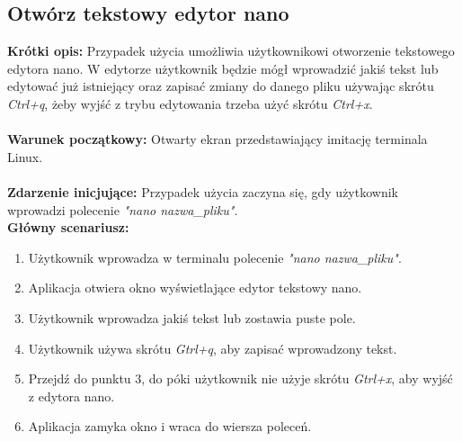\documentclass[10pt,a4paper]{report}
\begin{document}
\begin{adjustwidth}{2cm}{2cm}
\subsection{Otwórz tekstowy edytor nano}
\begin{minipage}{1\linewidth}
\textbf{Krótki opis:} Przypadek użycia umożliwia użytkownikowi otworzenie tekstowego edytora nano. W edytorze użytkownik będzie mógł wprowadzić jakiś tekst lub edytować już istniejący oraz zapisać zmiany do danego pliku używając skrótu \textit{Ctrl+q}, żeby wyjść z trybu edytowania trzeba użyć skrótu \textit{Ctrl+x}. \\ \\
\textbf{Warunek początkowy:} Otwarty ekran przedstawiający imitację terminala Linux. \\ \\
\textbf{Zdarzenie inicjujące:} Przypadek użycia zaczyna się, gdy użytkownik wprowadzi polecenie \textit{"nano nazwa\_pliku"}. \\
\textbf{Główny scenariusz:} 
\begin{enumerate}
\setlength\itemsep{0.2cm}
    \item Użytkownik wprowadza w terminalu polecenie \textit{"nano nazwa\_pliku"}.
    \item Aplikacja otwiera okno wyświetlające edytor tekstowy nano.
    \item Użytkownik wprowadza jakiś tekst lub zostawia puste pole. 
    \item Użytkownik używa skrótu \textit{Gtrl+q}, aby zapisać wprowadzony tekst.
    \item Przejdź do punktu 3, do póki użytkownik nie użyje skrótu \textit{Gtrl+x}, aby wyjść z edytora nano. 
    \item Aplikacja zamyka okno  i wraca do wiersza poleceń.
\end{enumerate}
\end{minipage}

\end{adjustwidth}
\end{document}
